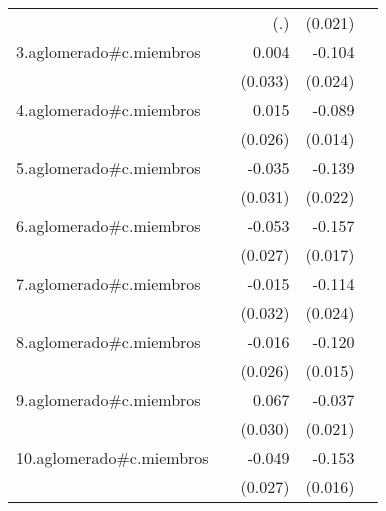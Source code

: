{\begin{longtable}{l*{4}{D{.}{.}{-1}}}
            &                     &         (.)         &     (0.021)         &                     \\
\addlinespace
3.aglomerado#c.miembros&                     &       0.004         &      -0.104\sym{***}&                     \\
            &                     &     (0.033)         &     (0.024)         &                     \\
\addlinespace
4.aglomerado#c.miembros&                     &       0.015         &      -0.089\sym{***}&                     \\
            &                     &     (0.026)         &     (0.014)         &                     \\
\addlinespace
5.aglomerado#c.miembros&                     &      -0.035         &      -0.139\sym{***}&                     \\
            &                     &     (0.031)         &     (0.022)         &                     \\
\addlinespace
6.aglomerado#c.miembros&                     &      -0.053         &      -0.157\sym{***}&                     \\
            &                     &     (0.027)         &     (0.017)         &                     \\
\addlinespace
7.aglomerado#c.miembros&                     &      -0.015         &      -0.114\sym{***}&                     \\
            &                     &     (0.032)         &     (0.024)         &                     \\
\addlinespace
8.aglomerado#c.miembros&                     &      -0.016         &      -0.120\sym{***}&                     \\
            &                     &     (0.026)         &     (0.015)         &                     \\
\addlinespace
9.aglomerado#c.miembros&                     &       0.067\sym{*}  &      -0.037         &                     \\
            &                     &     (0.030)         &     (0.021)         &                     \\
\addlinespace
10.aglomerado#c.miembros&                     &      -0.049         &      -0.153\sym{***}&                     \\
            &                     &     (0.027)         &     (0.016)         &                     \\

\end{longtable}}
